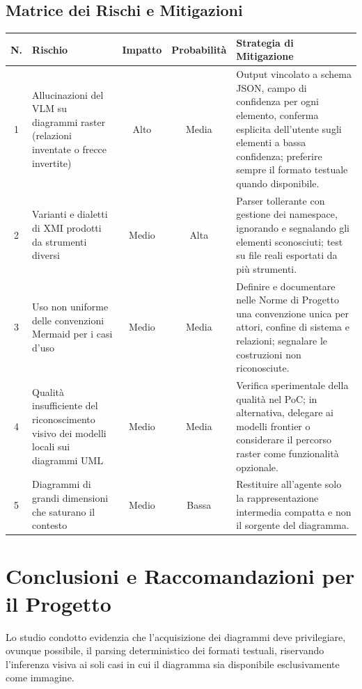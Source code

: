 \documentclass[a4paper, 11pt]{article}
\begin{document}
\subsection{Matrice dei Rischi e Mitigazioni}

\vspace{0.3cm}
\noindent
\begin{tabularx}{\textwidth}{|c|X|c|c|X|}
    \hline
    \textbf{N.} & \textbf{Rischio} & \textbf{Impatto} & \textbf{Probabilità} & \textbf{Strategia di Mitigazione} \\ \hline
    1 & Allucinazioni del VLM su diagrammi raster (relazioni inventate o frecce invertite) & Alto & Media & Output vincolato a schema JSON, campo di confidenza per ogni elemento, conferma esplicita dell'utente sugli elementi a bassa confidenza; preferire sempre il formato testuale quando disponibile. \\ \hline
    2 & Varianti e dialetti di XMI prodotti da strumenti diversi & Medio & Alta & Parser tollerante con gestione dei namespace, ignorando e segnalando gli elementi sconosciuti; test su file reali esportati da più strumenti. \\ \hline
    3 & Uso non uniforme delle convenzioni Mermaid per i casi d'uso & Medio & Media & Definire e documentare nelle Norme di Progetto una convenzione unica per attori, confine di sistema e relazioni; segnalare le costruzioni non riconosciute. \\ \hline
    4 & Qualità insufficiente del riconoscimento visivo dei modelli locali sui diagrammi UML & Medio & Media & Verifica sperimentale della qualità nel PoC; in alternativa, delegare ai modelli frontier o considerare il percorso raster come funzionalità opzionale. \\ \hline
    5 & Diagrammi di grandi dimensioni che saturano il contesto & Medio & Bassa & Restituire all'agente solo la rappresentazione intermedia compatta e non il sorgente del diagramma. \\ \hline
\end{tabularx}
\vspace{0.3cm}

\section{Conclusioni e Raccomandazioni per il Progetto}
Lo studio condotto evidenzia che l'acquisizione dei diagrammi deve privilegiare, ovunque possibile, il parsing deterministico dei formati testuali, riservando l'inferenza visiva ai soli casi in cui il diagramma sia disponibile esclusivamente come immagine.
\end{document}
